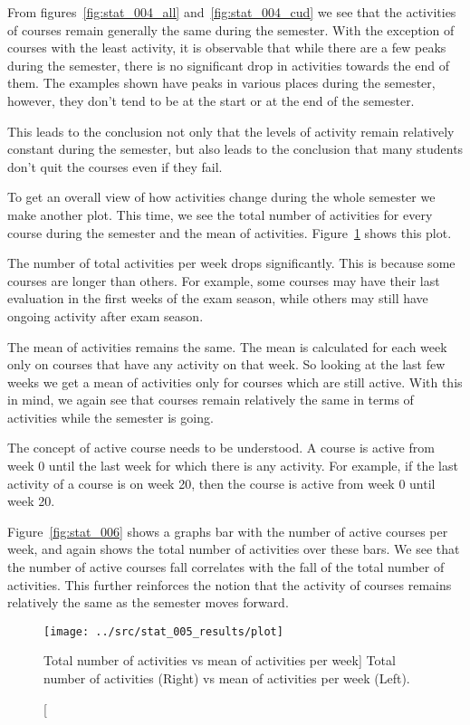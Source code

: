 From figures~\ref{fig:stat_004_all} and~\ref{fig:stat_004_cud} we see that the
activities of courses remain generally the same during the semester. With the
exception of courses with the least activity, it is observable that while there
are a few peaks during the semester, there is no significant drop in activities
towards the end of them. The examples shown have peaks in various places during
the semester, however, they don't tend to be at the start or at the end of the
semester.

This leads to the conclusion not only that the levels of activity remain
relatively constant during the semester, but also leads to the conclusion that
many students don't quit the courses even if they fail.

To get an overall view of how activities change during the whole semester we
make another plot. This time, we see the total number of activities for every
course during the semester and the mean of activities.
Figure~\ref{fig:stat_005} shows this plot.

The number of total activities per week drops significantly. This is because
some courses are longer than others. For example, some courses may have their
last evaluation in the first weeks of the exam season, while others may still
have ongoing activity after exam season.

The mean of activities remains the same. The mean is calculated for each week
only on courses that have any activity on that week. So looking at the last few
weeks we get a mean of activities only for courses which are still active. With
this in mind, we again see that courses remain relatively the same in terms of
activities while the semester is going.

The concept of active course needs to be understood. A course is active from
week 0 until the last week for which there is any activity. For example, if the
last activity of a course is on week 20, then the course is active from week 0
until week 20.

Figure~\ref{fig:stat_006} shows a graphs bar with the number of active courses
per week, and again shows the total number of activities over these bars. We
see that the number of active courses fall correlates with the fall of the
total number of activities. This further reinforces the notion that the
activity of courses remains relatively the same as the semester moves forward.

\begin{figure}[h!]
    \centering

    \texttt{[image: ../src/stat\_005\_results/plot]}

    \caption
        [Total number of activities vs mean of activities per week]
        {Total number of activities (Right) vs mean of activities per week
        (Left).}

    \label{fig:stat_005}
\end{figure}

